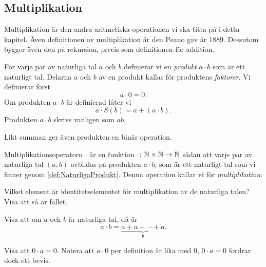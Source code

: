 \subsection{Multiplikation}
Multiplikation är den andra aritmetiska operationen vi ska titta på i detta
kapitel.
Även definitionen av multiplikation är den Peano gav år 1889.
Dessutom bygger även den på rekursion, precis som definitionen för addition.
\begin{definition}[Produkt]\label{def:NaturligaProdukt}\index{\(\cdot\)}
  För varje par av naturliga tal \(a\) och \(b\) definierar vi en
  \emph{produkt} \(a\cdot b\) som är ett naturligt tal.
  Delarna \(a\) och \(b\) av en produkt kallas för produktens \emph{faktorer}.
  Vi definierar först
  \begin{equation}
    a\cdot 0 = 0.
  \end{equation}
  Om produkten \(a\cdot b\) är definierad låter vi
  \begin{equation}
    a\cdot S(b) = a+(a\cdot b).
  \end{equation}
  Produkten \(a\cdot b\) skrivs vanligen som \(ab\).
\end{definition}

Likt summan ger även produkten en binär operation.
\begin{definition}[Multiplikation]\label{def:NaturligaMultiplikation}
  Multiplikationsoperatorn \(\cdot\) är en funktion
  \(\cdot\colon\mathbb{N}\times\mathbb{N}\to\mathbb{N}\) sådan att varje par av naturliga tal
  \((a,b)\) avbildas på produkten \(a\cdot b\), som är ett naturligt tal som
  vi finner genom \cref{def:NaturligaProdukt}.
  Denna operation kallar vi för \emph{multiplikation}.
\end{definition}

\begin{exercise}
  Vilket element är identitetselementet för multiplikation av de naturliga
  talen?
  Visa att så är fallet.
\end{exercise}
\begin{exercise}
  Visa att om \(a\) och \(b\) är naturliga tal, då är \[a\cdot b =
  \underbrace{a+a+\cdots+a}_b.\]
\end{exercise}
\begin{exercise}
  Visa att \(0\cdot a = 0\).
  Notera att \(a\cdot 0\) per definition är lika med \(0\), \(0\cdot a = 0\)
  fordrar dock ett bevis.
\end{exercise}


